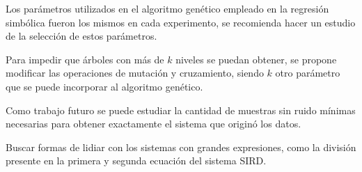 \begin{recomendations}

    Los parámetros utilizados en el algoritmo genético empleado en la regresión simbólica fueron los mismos en cada experimento, se recomienda hacer un estudio de la selección de estos parámetros.

    Para impedir que árboles con más de $k$ niveles se puedan obtener, se propone modificar las operaciones de mutación y cruzamiento, siendo $k$ otro parámetro que se puede incorporar al algoritmo genético.

    Como trabajo futuro se puede estudiar la cantidad de muestras sin ruido mínimas necesarias para obtener exactamente el sistema que originó los datos.

    Buscar formas de lidiar con los sistemas con grandes expresiones, como la división presente en la primera y segunda ecuación del sistema SIRD.

\end{recomendations}
